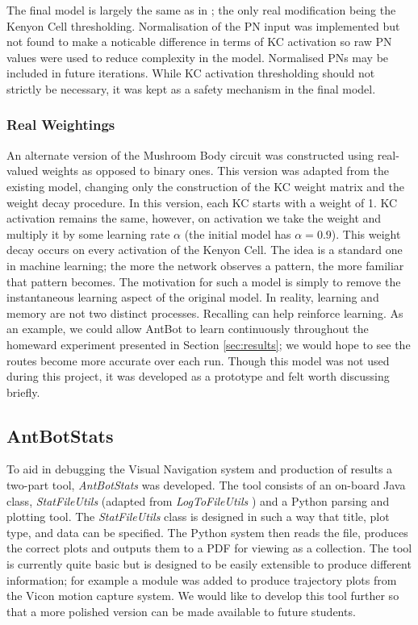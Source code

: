 \documentclass[a4paper,11pt,twoside,openright]{article}
\begin{document}
The final model is largely the same as in \cite{Eberding2016}; the only real modification being the Kenyon Cell thresholding.
Normalisation of the PN input was implemented but not found to make a noticable difference in terms of KC activation so raw
PN values were used to reduce complexity in the model. Normalised PNs may be included in future iterations.
While KC activation thresholding should not strictly be necessary, it was kept as a safety mechanism in the
final model.

\subsubsection{Real Weightings}
An alternate version of the Mushroom Body circuit was constructed using real-valued weights as opposed to binary ones. This
version was adapted from the existing model, changing only the construction of the KC weight matrix and the weight decay procedure.
In this version, each KC starts with a weight of 1. KC activation remains the same, however, on activation we take the weight and
multiply it by some learning rate $\alpha$ (the initial model has $\alpha = 0.9$). This weight decay occurs on every activation of the Kenyon Cell. The idea is
a standard one in machine learning; the more the network observes a pattern, the more familiar that pattern becomes. The motivation
for such a model is simply to remove the instantaneous learning aspect of the original model. In reality, learning and memory are
not two distinct processes. Recalling can help reinforce learning. As an example, we could allow AntBot to learn continuously throughout
the homeward experiment presented in Section \ref{sec:results}; we would hope to see the routes become more accurate over each run. Though
this model was not used during this project, it was developed as a prototype and felt worth discussing briefly.

\subsection{AntBotStats}\label{sec:abs}
To aid in debugging the Visual Navigation system and production of results a two-part tool, \textit{AntBotStats} was developed.
The tool consists of an on-board Java class, \textit{StatFileUtils} (adapted from \textit{LogToFileUtils} \cite{Zhang2017}) and a
Python parsing and plotting tool. The \textit{StatFileUtils} class is designed in such a way that title, plot type, and data can be
specified. The Python system then reads the file, produces the correct plots and outputs them to a PDF for viewing as a collection.
The tool is currently quite basic but is designed to be easily extensible to produce different information; for example a module was
added to produce trajectory plots from the Vicon motion capture system. We would like to develop this tool further so that a more
polished version can be made available to future students.
\newpage
\end{document}
